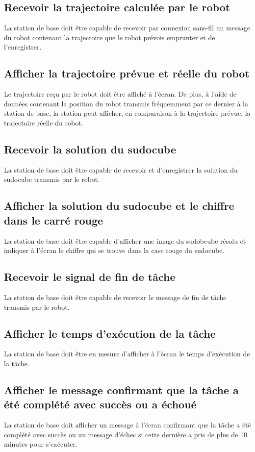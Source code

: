\subsection{Recevoir la trajectoire calculée par le robot}
La station de base doit être capable de recevoir par connexion sans-fil un message du robot contenant la trajectoire que le robot prévois emprunter et de l'enregistrer.
\subsection{Afficher la trajectoire prévue et réelle du robot}
Le trajectoire reçu par le robot doit être affiché à l'écran. De plus, à l'aide de données contenant la position du robot transmis fréquemment par ce dernier à la station de base, la station peut afficher, en comparaison à la trajectoire prévue, la trajectoire réelle du robot.
\subsection{Recevoir la solution du sudocube}
La station de base doit être capable de recevoir et d'enregistrer la solution du sudocube transmis par le robot.
\subsection{Afficher la solution du sudocube et le chiffre dans le carré rouge}
La station de base doit être capable d'afficher une image du sudobcube résolu et indiquer à l'écran le chiffre qui se trouve dans la case rouge du sudocube.
\subsection{Recevoir le signal de fin de tâche}
La station de base doit être capable de recevoir le message de fin de tâche transmis par le robot.
\subsection{Afficher le temps d'exécution de la tâche}
La station de base doit être en mesure d'afficher à l'écran le temps d'exécution de la tâche.
\subsection{Afficher le message confirmant que la tâche a été complété avec succès ou a échoué}
La station de base doit afficher un message à l'écran confirmant que la tâche a été complété avec succès ou un message d'échec si cette dernière a pris de plus de 10 minutes pour s'exécuter.
